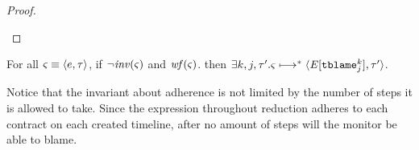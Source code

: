 {{\begin{proof}
\begin{byCases}
{\begin{byCases}
        \end{byCases}
      }
    \end{byCases}
  \end{proof}}
%
\begin{theorem}
  For all $\mstate\equiv\chevron{\mexp,\mTMons}$,
  if $\neg\inv(\mstate)$ and $\wf(\mstate)$. then $\exists k,j, \mTMons'. \mstate \machstep^* \chevron{\mctx{\mmlab^\prime}[\stblame{k}{j}], \mTMons'}$.
\end{theorem}
%
Notice that the invariant about adherence is not limited by the number of steps it is allowed to take.
%
Since the expression throughout reduction adheres to each contract on each created timeline, after no amount of steps will the monitor be able to blame.
}